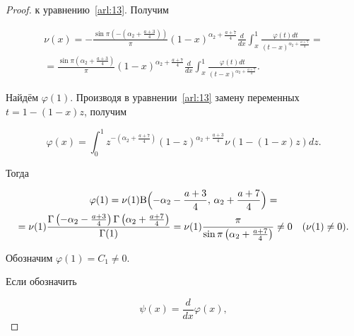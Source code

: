 \begin{proof}
к уравнению~\eqref{arl:13}. Получим

\begin{multline}


\nu(x)=-\frac{\sin\pi\left(-\left(\alpha_2+\frac{a+3}{4}\right)\right)}{\pi}(1-x)^{\alpha_2+\frac{a+7}{4}}\frac{d}{dx}\int_{x}^{1}\frac{\varphi(t)dt}{(t-x)^{\alpha_2+\frac{a+7}{4}}}=

\\

=\frac{\sin\pi\left(\alpha_2+\frac{a+3}{4}\right)}{\pi}(1-x)^{\alpha_2+\frac{a+7}{4}}\frac{d}{dx}\int_{x}^{1}\frac{\varphi(t)dt}{(t-x)^{\alpha_2+\frac{a+7}{4}}}.


\label{arl:14}

\end{multline}



Найдём $\varphi(1)$. Производя в уравнении~\eqref{arl:13} замену переменных \mbox{$t{=}1{-}(1{-}x)z$}, получим

$$\varphi(x)=\int_{0}^{1}z^{-\left(\alpha_2+\frac{a+7}{4}\right)}(1-z)^{\alpha_2+\frac{a+3}{4}}\nu(1-(1-x)z)dz.$$

Тогда

\begin{multline*}

\varphi(1)=\nu(1){\rm B}\Bigl(-\alpha_2-\frac{a+3}{4},\,\alpha_2+\frac{a+7}{4}\Bigr)=

\\

=\nu(1)\frac{\Gamma\left(-\alpha_2-\frac{a+3}{4}\right)\Gamma\left(\alpha_2+\frac{a+7}{4}\right)}{\Gamma(1)}%


=\nu(1)\frac{\pi}{\sin\pi\left(\alpha_2+\frac{a+7}{4}\right)}\neq 0 \quad (\nu(1)\neq 0).

\end{multline*}

Обозначим $\varphi(1)=C_1\neq 0$.

Если обозначить

\begin{equation}

\psi(x)=\frac{d}{dx}\varphi(x),

\label{arl:15}

\end{equation}


\end{proof}
